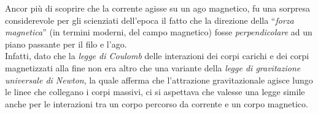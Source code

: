 \begin{digression}
	Ancor più di scoprire che la corrente agisse su un ago magnetico, fu una sorpresa considerevole per gli scienziati dell'epoca il fatto che la direzione della ``\textit{forza magnetica}'' (in termini moderni, del campo magnetico) fosse \textit{perpendicolare} ad un piano passante per il filo e l'ago.\\
	Infatti, dato che la \textit{legge di Coulomb} delle interazioni dei corpi carichi e dei corpi magnetizzati alla fine non era altro che una variante della \textit{legge di gravitazione universale di Newton}, la quale afferma che l'attrazione gravitazionale agisce lungo le linee che collegano i corpi massivi, ci si aspettava che valesse una legge simile anche per le interazioni tra un corpo percorso da corrente e un corpo magnetico.
\end{digression}
